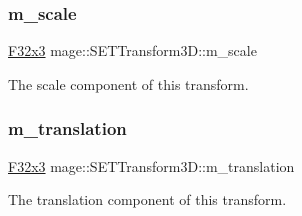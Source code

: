 \subsubsection{\texorpdfstring{m\+\_\+scale}{m\_scale}}
{\footnotesize\ttfamily \mbox{\hyperlink{namespacemage_a1e3c7a882af461f161caa1cbddaf1fa2}{F32x3}} mage\+::\+S\+E\+T\+Transform3\+D\+::m\+\_\+scale\hspace{0.3cm}{\ttfamily [private]}}

The scale component of this transform. \mbox{\label{classmage_1_1_s_e_t_transform3_d_ab93c4f34261dc89318fadf8855014c91}} 
\subsubsection{\texorpdfstring{m\+\_\+translation}{m\_translation}}
{\footnotesize\ttfamily \mbox{\hyperlink{namespacemage_a1e3c7a882af461f161caa1cbddaf1fa2}{F32x3}} mage\+::\+S\+E\+T\+Transform3\+D\+::m\+\_\+translation\hspace{0.3cm}{\ttfamily [private]}}

The translation component of this transform. 